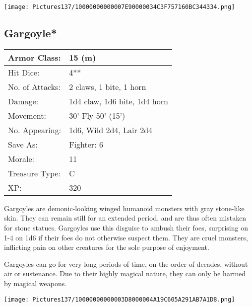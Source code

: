 \documentclass[a4paper,twoside,openany,10pt]{book}
\begin{document}
\begin{center}
	\texttt{[image: Pictures137/10000000000007E90000034C3F757160BC344334.png]}
\end{center}

\begin{multicols}{2}
	

\subsection*{Gargoyle*}\label{gargoyle}

\begin{tabularx}{0.48\textwidth}{@{}lX@{}}
Armor Class: & 15 (m) \\\hline
Hit Dice: & 4** \\\hline
No. of Attacks: & 2 claws, 1 bite, 1 horn \\\hline
Damage: & 1d4 claw, 1d6 bite, 1d4 horn \\\hline
Movement: & 30' Fly 50'
(15') \\\hline
No. Appearing: & 1d6, Wild 2d4, Lair 2d4 \\\hline
Save As: & Fighter: 6 \\\hline
Morale: & 11 \\\hline
Treasure Type: & C \\\hline
XP: & 320 \\\hline
\end{tabularx}\medskip



Gargoyles are demonic-looking winged humanoid monsters with gray stone-like skin. They can remain still for an extended period, and are thus often mistaken for stone statues. Gargoyles use this disguise to ambush their foes, surprising on 1-4 on 1d6 if their foes do not otherwise suspect them. They are cruel monsters, inflicting pain on other creatures for the sole purpose of enjoyment.

Gargoyles can go for very long periods of time, on the order of decades, without air or sustenance. Due to their highly magical nature, they can only be harmed by magical weapons.

\end{multicols}

\vfill

\begin{center}
	\texttt{[image: Pictures137/10000000000003D8000004A19C605A291AB7A1D8.png]}
\end{center}
\end{document}
